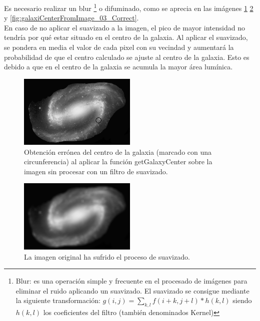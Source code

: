 \begin{enumerate}
	Es necesario realizar un blur \footnote{Blur: es una operación simple y frecuente en el procesado de imágenes para eliminar el ruido aplicando un suavizado. El suavizado se consigue  mediante la siguiente transformación: $g(i,j)=\sum_{k,l}f(i+k,j+l)*h(k,l)$ siendo $h(k,l)$ los coeficientes del filtro (también denominados Kernel)} o difuminado, como se aprecia en las imágenes \ref{fig:galaxiCenterFromImage_01_ERROR} \ref{fig:galaxiCenterFromImage_02_Blur} y \ref{fig:galaxiCenterFromImage_03_Correct}.\\
	En caso de no aplicar el suavizado a la imagen, el pico de mayor intensidad no tendría por qué estar situado en el centro de la galaxia. Al aplicar el suavizado, se pondera en media el valor de cada pixel con su vecindad y aumentará la probabilidad de que el centro calculado se ajuste al centro de la galaxia. Esto es debido a que en el centro de la galaxia se acumula la mayor área lumínica.
	\begin{figure}[!htb]
		\centering
		\includegraphics[width=0.5\textwidth]{images/galaxiCenterFromImage_01_ERROR.png}
		\caption{\label{fig:galaxiCenterFromImage_01_ERROR}{\small Obtención errónea del centro de la galaxia (marcado con una circunferencia) al aplicar la función {\scriptsize getGalaxyCenter} sobre la imagen sin procesar con un filtro de suavizado.}}
	\end{figure}
	\begin{figure}[!htb]
		\centering
		\includegraphics[width=0.5\textwidth]{images/galaxiCenterFromImage_02_Blur.png}
		\caption{\label{fig:galaxiCenterFromImage_02_Blur}La imagen original ha sufrido el proceso de suavizado.}
	\end{figure}
	\begin{figure}[!htb]

\end{figure}
\end{enumerate}
